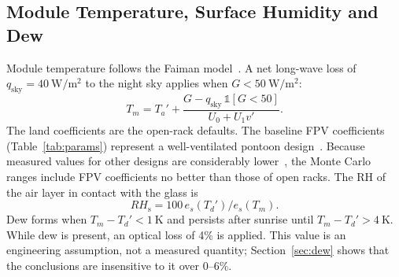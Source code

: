 \documentclass[journal]{IEEEtran}
\newcommand{\RHs}{\mathit{RH}_{\mathrm{s}}}
\begin{document}
\subsection{Module Temperature, Surface Humidity and Dew}
Module temperature follows the Faiman model~\cite{faiman2008}. A net long-wave loss of
$q_{\mathrm{sky}}=\SI{40}{\watt\per\square\metre}$ to the night sky applies when $G<\SI{50}{\watt\per\square\metre}$:
\begin{equation}
T_m = T_a' + \frac{G - q_{\mathrm{sky}}\,\mathbb{1}[G<50]}{U_0 + U_1 v'}.
\label{eq:faiman}
\end{equation}
The land coefficients are the open-rack defaults. The baseline FPV coefficients (Table~\ref{tab:params}) represent a
well-ventilated pontoon design~\cite{liu2018,dorenkamper2021}. Because measured values for other designs are
considerably lower~\cite{nysted2024,wu2024,dorenkamper2024,firat2026}, the Monte Carlo ranges include FPV coefficients
no better than those of open racks. The RH of the air layer in contact with the glass is
\begin{equation}
\RHs = 100\,e_s(T_d')/e_s(T_m).
\label{eq:rhs}
\end{equation}
Dew forms when $T_m - T_d' < \SI{1}{\kelvin}$ and persists after sunrise until $T_m - T_d' > \SI{4}{\kelvin}$. While dew
is present, an optical loss of 4\% is applied. This value is an engineering assumption, not a measured quantity;
Section~\ref{sec:dew} shows that the conclusions are insensitive to it over 0--6\%.
\end{document}
